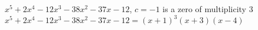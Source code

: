 {$x^5+2x^4-12x^3-38x^2-37x-12$, $c=-1$ is a zero of multiplicity 3}
{$x^5+2x^4-12x^3-38x^2-37x-12 = (x+1)^3(x+3)(x-4)$}